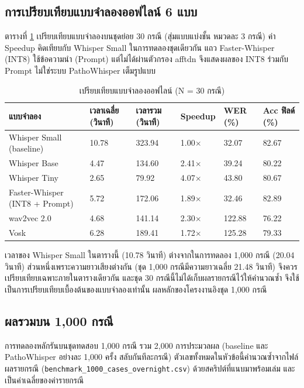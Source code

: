 \subsection{การเปรียบเทียบแบบจำลองออฟไลน์ 6 แบบ}

ตารางที่ \ref{tab:models} เปรียบเทียบแบบจำลองบนชุดย่อย 30 กรณี (สุ่มแบบแบ่งชั้น หมวดละ 3 กรณี) ค่า Speedup คิดเทียบกับ Whisper Small ในการทดลองชุดเดียวกัน แถว Faster-Whisper (INT8) ใช้ข้อความนำ (Prompt) แต่ไม่ได้ผ่านตัวกรอง afftdn จึงแสดงผลของ INT8 ร่วมกับ Prompt ไม่ใช่ระบบ PathoWhisper เต็มรูปแบบ

\begin{table}[H]
\centering
\caption{เปรียบเทียบแบบจำลองออฟไลน์ (N = 30 กรณี)}
\label{tab:models}
\footnotesize\setlength{\tabcolsep}{3pt}
\begin{tabular}{|p{3.1cm}|p{1.9cm}|p{1.9cm}|p{2.2cm}|p{1.5cm}|p{2.0cm}|}
\hline
\textbf{แบบจำลอง} & \textbf{เวลาเฉลี่ย (วินาที)} & \textbf{เวลารวม (วินาที)} & \textbf{Speedup} & \textbf{WER (\%)} & \textbf{Acc ฟิลด์ (\%)} \\
\hline
Whisper Small (baseline) & 10.78 & 323.94 & 1.00$\times$ & 32.07 & 82.67 \\
\hline
Whisper Base & 4.47 & 134.60 & 2.41$\times$ & 39.24 & 80.22 \\
\hline
Whisper Tiny & 2.65 & 79.92 & 4.07$\times$ & 43.80 & 80.67 \\
\hline
Faster-Whisper (INT8 + Prompt) & 5.72 & 172.06 & 1.89$\times$ & 32.46 & 82.89 \\
\hline
wav2vec 2.0 & 4.68 & 141.14 & 2.30$\times$ & 122.88 & 76.22 \\
\hline
Vosk & 6.28 & 189.41 & 1.72$\times$ & 125.28 & 79.33 \\
\hline
\end{tabular}
\end{table}

\noindent เวลาของ Whisper Small ในตารางนี้ (10.78 วินาที) ต่างจากในการทดลอง 1,000 กรณี (20.04 วินาที) ส่วนหนึ่งเพราะความยาวเสียงต่างกัน (ชุด 1,000 กรณีมีความยาวเฉลี่ย 21.48 วินาที) จึงควรเปรียบเทียบเฉพาะภายในตารางเดียวกัน และชุด 30 กรณีนี้ไม่ได้เก็บผลรายกรณีไว้ให้คำนวณซ้ำ จึงใช้เป็นการเปรียบเทียบเบื้องต้นของแบบจำลองเท่านั้น ผลหลักของโครงงานอิงชุด 1,000 กรณี

\subsection{ผลรวมบน 1,000 กรณี}

การทดลองหลักรันบนชุดทดสอบ 1,000 กรณี รวม 2,000 การประมวลผล (baseline และ PathoWhisper อย่างละ 1,000 ครั้ง สลับกันทีละกรณี) ตัวเลขทั้งหมดในหัวข้อนี้คำนวณซ้ำจากไฟล์ผลรายกรณี (\texttt{benchmark\_1000\_cases\_overnight.csv}) ด้วยสคริปต์ที่แนบมาพร้อมเล่ม และเป็นค่าเฉลี่ยของค่ารายกรณี

